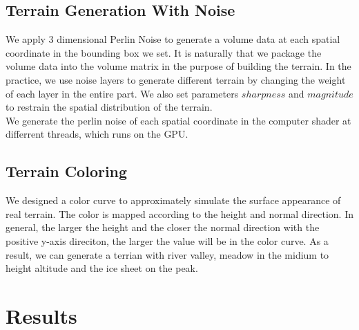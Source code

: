 \documentclass[acmtog]{acmart}
\begin{document}
\subsection{Terrain Generation With Noise}
We apply 3 dimensional Perlin Noise to generate a volume data at each spatial coordinate in the bounding box we set.
It is naturally that we package the volume data into the volume matrix in the purpose of building the terrain.
In the practice, we use noise layers to generate different terrain by changing the weight of each layer in the entire part.
We also set parameters $sharpness$ and $magnitude$ to restrain the spatial distribution of the terrain. \\
We generate the perlin noise of each spatial coordinate in the computer shader at differrent threads, which runs on the GPU.

\subsection{Terrain Coloring}
We designed a color curve to approximately simulate the surface appearance of real terrain.
The color is mapped according to the height and normal direction.
In general, the larger the height and the closer the normal direction with the positive y-axis direciton,
the larger the value will be in the color curve. As a result, we can generate a terrian with river valley,
meadow in the midium to height altitude and the ice sheet on the peak.

\section{Results}
\end{document}
